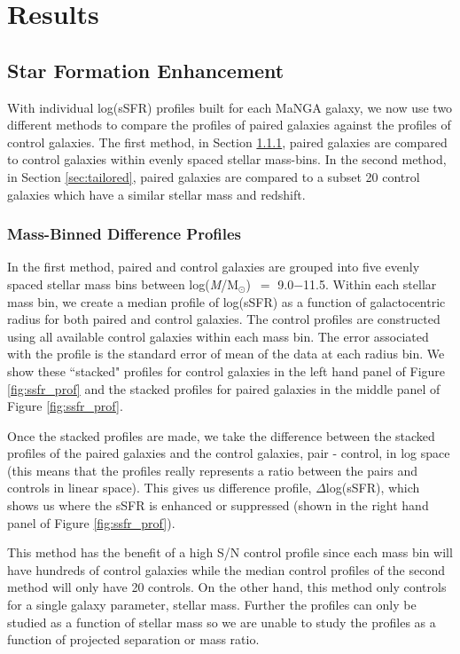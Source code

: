 \documentclass[iop,revtex4,twocolumn,apj,numberedappendix,appendixfloats]{emulateapj}
\newcommand{\logm}{log({\it M}/M$_{\odot}$)}
\begin{document}
\section{Results}\label{sec:results}

\subsection{Star Formation Enhancement}

With individual log(sSFR) profiles built for each MaNGA galaxy, we now use two different methods to compare the profiles of paired galaxies against the profiles of control galaxies. The first method, in Section \ref{sec:mass-bin}, paired galaxies are compared to control galaxies within evenly spaced stellar mass-bins. In the second method, in Section \ref{sec:tailored}, paired galaxies are compared to a subset 20 control galaxies which have a similar stellar mass and redshift. 

\subsubsection{Mass-Binned Difference Profiles}\label{sec:mass-bin}

In the first method, paired and control galaxies are grouped into five evenly spaced stellar mass bins between \logm\ $=$ 9.0$-$11.5. Within each stellar mass bin, we create a median profile of log(sSFR) as a function of galactocentric radius for both paired and control galaxies. The control profiles are constructed using all available control galaxies within each mass bin. The error associated with the profile is the standard error of mean of the data at each radius bin. We show these ``stacked" profiles for control galaxies in the left hand panel of Figure \ref{fig:ssfr_prof} and the stacked profiles for paired galaxies in the middle panel of Figure \ref{fig:ssfr_prof}.

Once the stacked profiles are made, we take the difference between the stacked profiles of the paired galaxies and the control galaxies, pair - control, in log space (this means that the profiles really represents a ratio between the pairs and controls in linear space). This gives us difference profile, $\Delta$log(sSFR), which shows us where the sSFR is enhanced or suppressed (shown in the right hand panel of Figure \ref{fig:ssfr_prof}). 

This method has the benefit of a high S/N control profile since each mass bin will have hundreds of control galaxies while the median control profiles of the second method will only have 20 controls. On the other hand, this method only controls for a single galaxy parameter, stellar mass. Further the profiles can only be studied as a function of stellar mass so we are unable to study the profiles as a function of projected separation or mass ratio. 
\end{document}
